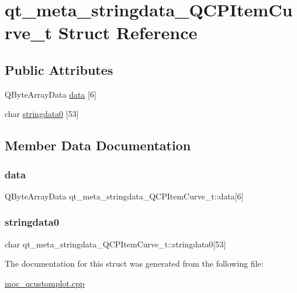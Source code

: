 \hypertarget{structqt__meta__stringdata__QCPItemCurve__t}{}\section{qt\+\_\+meta\+\_\+stringdata\+\_\+\+Q\+C\+P\+Item\+Curve\+\_\+t Struct Reference}
\label{structqt__meta__stringdata__QCPItemCurve__t}
\subsection*{Public Attributes}
\begin{DoxyCompactItemize}
\item 
Q\+Byte\+Array\+Data \mbox{\hyperlink{structqt__meta__stringdata__QCPItemCurve__t_ac6d43f09ee6cd9ad95da06d7fd942e8f}{data}} \mbox{[}6\mbox{]}
\item 
char \mbox{\hyperlink{structqt__meta__stringdata__QCPItemCurve__t_a52ddb589fe5c4e7eba75b1eb50799729}{stringdata0}} \mbox{[}53\mbox{]}
\end{DoxyCompactItemize}


\subsection{Member Data Documentation}
\mbox{\label{structqt__meta__stringdata__QCPItemCurve__t_ac6d43f09ee6cd9ad95da06d7fd942e8f}} 
\subsubsection{\texorpdfstring{data}{data}}
{\footnotesize\ttfamily Q\+Byte\+Array\+Data qt\+\_\+meta\+\_\+stringdata\+\_\+\+Q\+C\+P\+Item\+Curve\+\_\+t\+::data\mbox{[}6\mbox{]}}

\mbox{\label{structqt__meta__stringdata__QCPItemCurve__t_a52ddb589fe5c4e7eba75b1eb50799729}} 
\subsubsection{\texorpdfstring{stringdata0}{stringdata0}}
{\footnotesize\ttfamily char qt\+\_\+meta\+\_\+stringdata\+\_\+\+Q\+C\+P\+Item\+Curve\+\_\+t\+::stringdata0\mbox{[}53\mbox{]}}



The documentation for this struct was generated from the following file\+:\begin{DoxyCompactItemize}
\item 
\mbox{\hyperlink{moc__qcustomplot_8cpp}{moc\+\_\+qcustomplot.\+cpp}}\end{DoxyCompactItemize}
